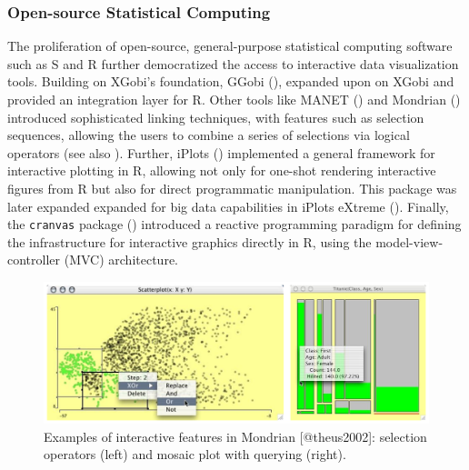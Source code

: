 \documentclass[
]{book}
\begin{document}
\subsubsection{Open-source Statistical Computing}\label{open-source-statistical-computing}

The proliferation of open-source, general-purpose statistical computing software such as S and R further democratized the access to interactive data visualization tools. Building on XGobi's foundation, GGobi (), expanded upon on XGobi and provided an integration layer for R. Other tools like MANET () and Mondrian () introduced sophisticated linking techniques, with features such as selection sequences, allowing the users to combine a series of selections via logical operators (see also ). Further, iPlots () implemented a general framework for interactive plotting in R, allowing not only for one-shot rendering interactive figures from R but also for direct programmatic manipulation. This package was later expanded expanded for big data capabilities in iPlots eXtreme (). Finally, the \texttt{cranvas} package () introduced a reactive programming paradigm for defining the infrastructure for interactive graphics directly in R, using the model-view-controller (MVC) architecture.

\begin{figure}

{\centering \includegraphics[width=15.83in]{./figures/mondrian} 

}

\caption{Examples of interactive features in Mondrian [@theus2002]: selection operators (left) and mosaic plot with querying (right).}\label{fig:unnamed-chunk-5}
\end{figure}
\end{document}

